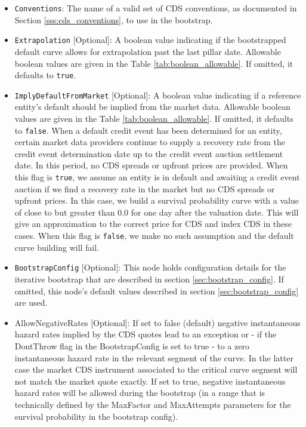 \begin{itemize}
\item \lstinline!Conventions!:
The name of a valid set of CDS conventions, as documented in Section \ref{sss:cds_conventions}, to use in the bootstrap.

\item \lstinline!Extrapolation! [Optional]:
A boolean value indicating if the bootstrapped default curve allows for extrapolation past the last pillar date. Allowable boolean values are given in the Table \ref{tab:boolean_allowable}. If omitted, it defaults to \lstinline!true!.

\item \lstinline!ImplyDefaultFromMarket! [Optional]:
A boolean value indicating if a reference entity's default should be implied from the market data. Allowable boolean values are given in the Table \ref{tab:boolean_allowable}. If omitted, it defaults to \lstinline!false!. When a default credit event has been determined for an entity, certain market data providers continue to supply a recovery rate from the credit event determination date up to the credit event auction settlement date. In this period, no CDS spreads or upfront prices are provided. When this flag is \lstinline!true!, we assume an entity is in default and awaiting a credit event auction if we find a recovery rate in the market but no CDS spreads or upfront prices. In this case, we build a survival probability curve with a value of close to but greater than 0.0 for one day after the valuation date. This will give an approximation to the correct price for CDS and index CDS in these cases. When this flag is \lstinline!false!, we make no such assumption and the default curve building will fail.

\item \lstinline!BootstrapConfig! [Optional]:
This node holds configuration details for the iterative bootstrap that are described in section \ref{sec:bootstrap_config}. If omitted, this node's default values described in section \ref{sec:bootstrap_config} are used.

\item AllowNegativeRates [Optional]: If set to false (default) negative instantaneous hazard rates implied by the CDS
  quotes lead to an exception or - if the DontThrow flag in the BootstrapConfig is set to true - to a zero instantaneous
  hazard rate in the relevant segment of the curve. In the latter case the market CDS instrument associated to the
  critical curve segment will not match the market quote exactly. If set to true, negative instantaneous hazard rates
  will be allowed during the bootstrap (in a range that is technically defined by the MaxFactor and MaxAttempts
  parameters for the survival probability in the bootstrap config).


\end{itemize}
